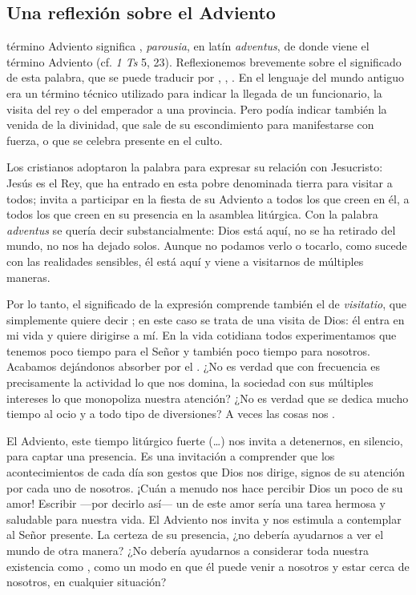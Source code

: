 \begin{introstyle}
	
	\newsection
	\section{Una reflexión sobre el Adviento}
	
	
	 término Adviento significa , \emph{parousia}, en latín \emph{adventus}, de donde viene el término Adviento (cf. \emph{1 Ts} 5, 23). Reflexionemos brevemente sobre el significado de esta palabra, que se puede traducir por , , . En el lenguaje del mundo antiguo era un término técnico utilizado para indicar la llegada de un funcionario, la visita del rey o del emperador a una provincia. Pero podía indicar también la venida de la divinidad, que sale de su escondimiento para manifestarse con fuerza, o que se celebra presente en el culto. 
	
	Los cristianos adoptaron la palabra  para expresar su relación con Jesucristo: Jesús es el Rey, que ha entrado en esta pobre  denominada tierra para visitar a todos; invita a participar en la fiesta de su Adviento a todos los que creen en él, a todos los que creen en su presencia en la asamblea litúrgica. Con la palabra \emph{adventus} se quería decir substancialmente: Dios está aquí, no se ha retirado del mundo, no nos ha dejado solos. Aunque no podamos verlo o tocarlo, como sucede con las realidades sensibles, él está aquí y viene a visitarnos de múltiples maneras.
	
	Por lo tanto, el significado de la expresión  comprende también el de \emph{visitatio}, que simplemente quiere decir ; en este caso se trata de una visita de Dios: él entra en mi vida y quiere dirigirse a mí. En la vida cotidiana todos experimentamos que tenemos poco tiempo para el Señor y también poco tiempo para nosotros. Acabamos dejándonos absorber por el . ¿No es verdad que con frecuencia es precisamente la actividad lo que nos domina, la sociedad con sus múltiples intereses lo que monopoliza nuestra atención? ¿No es verdad que se dedica mucho tiempo al ocio y a todo tipo de diversiones? A veces las cosas nos .
	
	El Adviento, este tiempo litúrgico fuerte (\ldots{}) nos invita a detenernos, en silencio, para captar una presencia. Es una invitación a comprender que los acontecimientos de cada día son gestos que Dios nos dirige, signos de su atención por cada uno de nosotros. ¡Cuán a menudo nos hace percibir Dios un poco de su amor! Escribir ---por decirlo así--- un  de este amor sería una tarea hermosa y saludable para nuestra vida. El Adviento nos invita y nos estimula a contemplar al Señor presente. La certeza de su presencia, ¿no debería ayudarnos a ver el mundo de otra manera? ¿No debería ayudarnos a considerar toda nuestra existencia como , como un modo en que él puede venir a nosotros y estar cerca de nosotros, en cualquier situación?
	

\end{introstyle}
